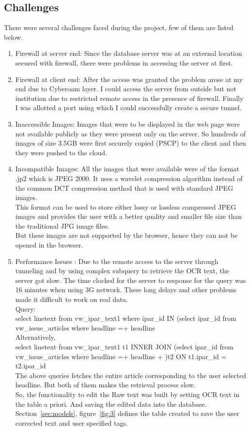 \documentclass[12pt]{article}
\begin{document}
\subsection{Challenges}
There were several challenges faced during the project, few of them are listed below.
\begin{enumerate}
\item Firewall at server end: Since the database server was at an external location secured with firewall, there were problems in accessing the server at first.
\item Firewall at client end: After the access was granted the problem arose at my end due to Cyberoam layer. I could access the server from outside but not institution due to restricted remote access in the presence of firewall. Finally I was allotted a port using which I could successfully create a secure tunnel.
\item Inaccessible Images: Images that were to be displayed in the web page were not available publicly as they were present only on the server. So hundreds of images of size 3.5GB were first securely copied (PSCP) to the client and then they were pushed to the cloud.
\item Incompatible Images: All the images that were available were of the format .jp2 which is JPEG 2000. It uses a wavelet compression algorithm instead of the common DCT compression method that is used with standard JPEG images.\\
This format can be used to store either lossy or lossless compressed JPEG images and provides the user with a better quality and smaller file size than the traditional JPG image files.\\
But these images are not supported by the browser, hence they can not be opened in the browser.
\item Performance Issues : Due to the remote access to the server through tunneling and by using complex subquery to retrieve the OCR text, the server got slow. The time clocked for the server to response for the query was 16 minutes when using 3G network. These long delays and other problems made it difficult to work on real data. \\
Query: \\
\textgravedbl select linetext from vw\_ipar\_text1 where ipar\_id IN (select  ipar\_id from vw\_issue\_articles where headline =\textasciidieresis + headline \\
Alternatively,\\
\textgravedbl select linetext from vw\_ipar\_text1 t1 INNER JOIN (select ipar\_id from vw\_issue\_articles where headline =\textasciigrave \textasciidieresis + headline + \textacutedbl\textasciiacute)t2 ON t1.ipar\_id = t2.ipar\_id \textasciidieresis \\
The above queries fetches the entire article corresponding to the user selected headline. But both of them makes the retrieval process slow.\\
So, the functionality to edit the Raw text was built by setting OCR text in the table a priori. And saving the edited data into the database. Section~\ref{sec:models}, figure~\ref{fig:3} defines the table created to save the user corrected text and user specified tags.


\end{enumerate}
\end{document}
